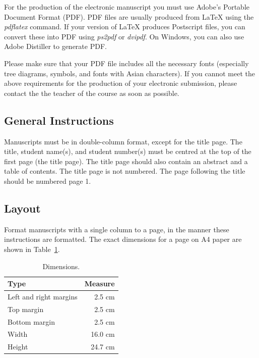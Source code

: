 \documentclass[11pt]{article}
\begin{document}
For the production of the electronic manuscript you must use Adobe's
Portable Document Format (PDF). PDF files are usually produced from
\LaTeX{} using the \textit{pdflatex} command. If your version of
\LaTeX{} produces Postscript files, you can convert these into PDF
using \textit{ps2pdf} or \textit{dvipdf}. On Windows, you can also use
Adobe Distiller to generate PDF.  

Please make sure that your PDF file includes all the necessary fonts
(especially tree diagrams, symbols, and fonts with Asian characters).
If you cannot meet the above requirements for the production of your
electronic submission, please contact the the teacher of the course as
soon as possible.


\subsection{General Instructions}

Manuscripts must be in double-column format, except for the title
page.  The title, student name(s), and student number(s) must be
centred at the top of the first page (the title page). The title page
should also contain an abstract and a table of contents.  The title
page is not numbered. The page following the title should be
numbered page 1.


\subsection{Layout}
\label{ssec:layout}

Format manuscripts with a single column to a page, in the manner these
instructions are formatted. The exact dimensions for a page on A4
paper are shown in Table~\ref{table:sizes}.

\begin{table}[htbp]
\caption{\label{table:sizes} Dimensions.}
\begin{center}
\begin{tabular}{|l|r|}
\hline 
\bf Type & \bf Measure \\ 
\hline
\hline
Left and right margins &2.5 cm\\
 Top margin & 2.5 cm\\
Bottom margin& 2.5 cm\\
 Width& 16.0 cm\\
Height& 24.7 cm\\
\hline
\end{tabular}
\end{center}
\end{table}
\end{document}
